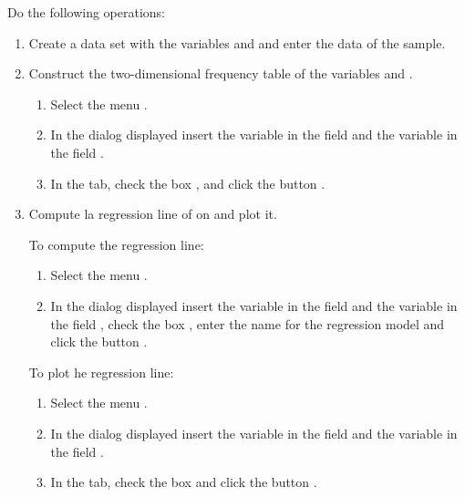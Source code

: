 \begin{enumerate}[leftmargin=*]
Do the following operations:
\begin{enumerate}
\item  Create a data set with the variables  and  and enter the data of
the sample.

\item Construct the two-dimensional frequency table of the variables  and
.
\begin{indication}
\begin{enumerate}
\item Select the menu .
\item In the dialog displayed insert the variable  in the field  and the variable  in the field .
\item In the  tab, check the box , and
click the button . 
\end{enumerate}
\end{indication}

\item Compute la regression line of  on   and plot it.
\begin{indication}
To compute the regression line:
\begin{enumerate}
\item Select the menu .
\item In the dialog displayed insert the variable  in the field  and
the variable  in the field , check the box ,
enter the name  for the regression model and click the button
.
\end{enumerate}
To plot he regression line:
\begin{enumerate}
\item Select the menu .
\item In the dialog displayed insert the variable  in the field  and the
variable  in the field .
\item In the  tab, check the box  and click the button .
\end{enumerate}
\end{indication}


\end{enumerate}
\end{enumerate}
